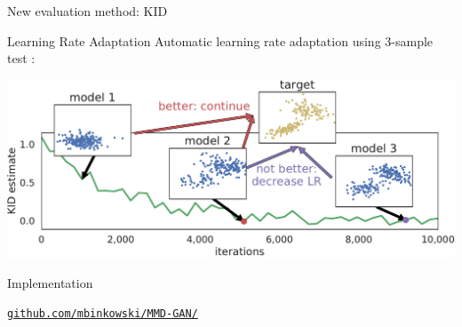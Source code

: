 \documentclass[xcolor={table}]{beamer}
\newcommand{\httpsurl}[1]{\href{https://#1}{\nolinkurl{#1}}}
\begin{document}
\begin{frame}{}
\begin{columns}[T, totalwidth=\textwidth]
\begin{column}{.32\textwidth}
\begin{block}{New evaluation method: KID}
    \end{block}

    \begin{block}{Learning Rate Adaptation}
      Automatic learning rate adaptation using 3-sample test \parencite{3sample}:

      \includegraphics[width=\linewidth]{figs/KID-LR.pdf}
    \end{block}

    \vspace*{-2ex}
    \begin{block}{Implementation}
      \begin{center}
        {\color{blue} \httpsurl{github.com/mbinkowski/MMD-GAN/}}
      \end{center}
    \end{block}

    \printbibliography
  \end{column}

\end{columns}


\end{frame}
\end{document}
